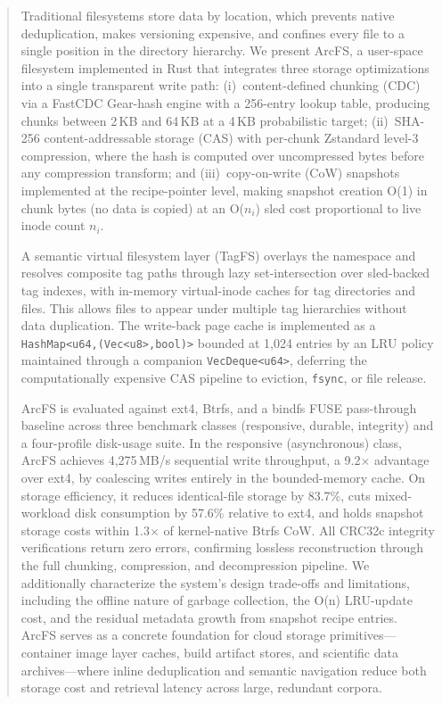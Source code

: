 \documentclass[journal]{IEEEtran}
\begin{document}
\begin{abstract}
Traditional filesystems store data by location, which prevents native
deduplication, makes versioning expensive, and confines every file to a
single position in the directory hierarchy. We present ArcFS, a
user-space filesystem implemented in Rust that integrates three storage
optimizations into a single transparent write path:
(i)~content-defined chunking (CDC) via a FastCDC Gear-hash engine with
a 256-entry lookup table, producing chunks between 2\,KB and 64\,KB at
a 4\,KB probabilistic target;
(ii)~SHA-256 content-addressable storage (CAS) with per-chunk Zstandard
level-3 compression, where the hash is computed over uncompressed bytes
before any compression transform; and
(iii)~copy-on-write (CoW) snapshots implemented at the recipe-pointer
level, making snapshot creation O(1) in chunk bytes (no data is
copied) at an O($n_i$) sled cost proportional to live inode count
$n_i$.

A semantic virtual filesystem layer (TagFS) overlays the namespace and
resolves composite tag paths through lazy set-intersection over
sled-backed tag indexes, with in-memory virtual-inode caches for tag
directories and files. This allows files to appear under multiple tag
hierarchies without data duplication. The write-back page cache is
implemented as a \texttt{HashMap\textless{}u64,(Vec\textless{}u8\textgreater{},bool)\textgreater{}}
bounded at 1,024 entries by an LRU policy maintained through a
companion \texttt{VecDeque\textless{}u64\textgreater{}}, deferring the
computationally expensive CAS pipeline to eviction, \texttt{fsync},
or file release.

ArcFS is evaluated against ext4, Btrfs, and a bindfs FUSE pass-through
baseline across three benchmark classes (responsive, durable, integrity)
and a four-profile disk-usage suite. In the responsive (asynchronous)
class, ArcFS achieves 4,275\,MB/s sequential write throughput, a
9.2$\times$ advantage over ext4, by coalescing writes entirely in
the bounded-memory cache. On storage efficiency, it reduces
identical-file storage by 83.7\%, cuts mixed-workload disk consumption
by 57.6\% relative to ext4, and holds snapshot storage costs within
1.3$\times$ of kernel-native Btrfs CoW. All CRC32c integrity
verifications return zero errors, confirming lossless reconstruction
through the full chunking, compression, and decompression pipeline.
We additionally characterize the system's design trade-offs and
limitations, including the offline nature of garbage collection, the
O(n) LRU-update cost, and the residual metadata growth from snapshot
recipe entries.  ArcFS serves as a concrete foundation for cloud
storage primitives---container image layer caches, build artifact stores,
and scientific data archives---where inline deduplication and semantic
navigation reduce both storage cost and retrieval latency across large,
redundant corpora.
\end{abstract}
\end{document}

